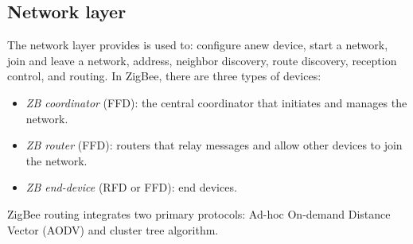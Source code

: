 \subsection{Network layer}
The network layer provides is used to: configure anew device, start a network, join and leave a network, address, neighbor discovery, route discovery, reception control, and routing.
In ZigBee, there are three types of devices:
\begin{itemize}
    \item \textit{ZB coordinator} (FFD): the central coordinator that initiates and manages the network.
    \item \textit{ZB router} (FFD): routers that relay messages and allow other devices to join the network.
    \item \textit{ZB end-device} (RFD or FFD): end devices.
\end{itemize}
\noindent ZigBee routing integrates two primary protocols: Ad-hoc On-demand Distance Vector (AODV) and cluster tree algorithm. 

